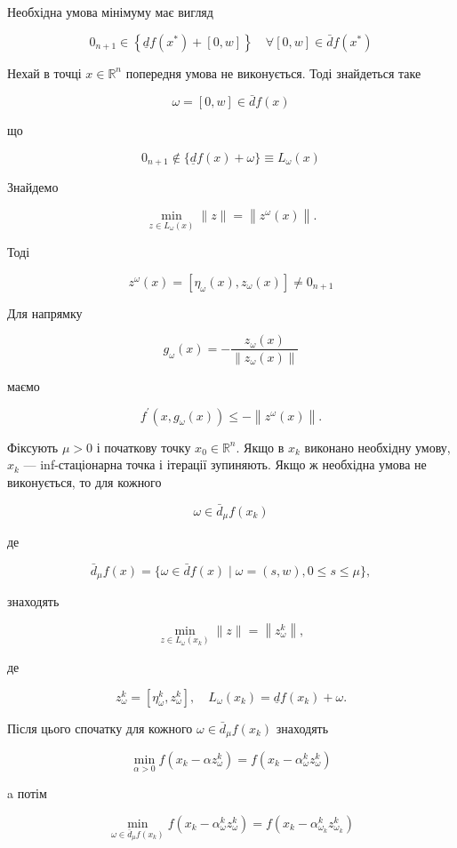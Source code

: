 \documentclass[12pt,a4paper]{extarticle}
\numberwithin{section}{part}
\begin{document}
Необхідна умова мінімуму має вигляд

$$
0_{n+1} \in\left\{\underline{d} f\left(x^{*}\right)+[0, w]\right\} \quad \forall[0, w] \in \bar{d} f\left(x^{*}\right)
$$

Нехай в точці $x \in \mathbb{R}^{n}$ попередня умова не виконується. Тоді знайдеться таке

$$
\omega=[0, w] \in \bar{d} f(x)
$$

що

$$
0_{n+1} \notin\{\underline{d} f(x)+\omega\} \equiv L_{\omega}(x)
$$

Знайдемо

$$
\min _{z \in L_{\omega}(x)}\|z\|=\left\|z^{\omega}(x)\right\| .
$$

Тоді

$$
z^{\omega}(x)=\left[\eta_{\omega}(x), z_{\omega}(x)\right] \neq 0_{n+1}
$$

Для напрямку

$$
g_{\omega}(x)=-\frac{z_{\omega}(x)}{\left\|z_{\omega}(x)\right\|}
$$

маємо

$$
f^{\prime}\left(x, g_{\omega}(x)\right) \leq-\left\|z^{\omega}(x)\right\| .
$$

Фіксують $\mu>0$ і початкову точку $x_{0} \in \mathbb{R}^{n}$. Якщо в $x_{k}$ виконано необхідну умову, $x_{k}$ --- inf-стаціонарна точка і ітерації зупиняють. Якщо ж необхідна умова не виконується, то для кожного

$$
\omega \in \bar{d}_{\mu} f\left(x_{k}\right)
$$

де

$$
\bar{d}_{\mu} f(x)=\{\omega \in \bar{d} f(x) \mid \omega=(s, w), 0 \leq s \leq \mu\},
$$

знаходять

$$
\min _{z \in L_{\omega}\left(x_{k}\right)}\|z\|=\left\|z_{\omega}^{k}\right\|,
$$

де

$$
z_{\omega}^{k}=\left[\eta_{\omega}^{k}, z_{\omega}^{k}\right], \quad L_{\omega}\left(x_{k}\right)=\underline{d} f\left(x_{k}\right)+\omega .
$$

Після цього спочатку для кожного $\omega \in \bar{d}_{\mu} f\left(x_{k}\right)$ знаходять

$$
\min _{\alpha>0} f\left(x_{k}-\alpha z_{\omega}^{k}\right)=f\left(x_{k}-\alpha_{\omega}^{k} z_{\omega}^{k}\right)
$$

a потім

$$
\min _{\omega \in \bar{d}_{\mu} f\left(x_{k}\right)} f\left(x_{k}-\alpha_{\omega}^{k} z_{\omega}^{k}\right)=f\left(x_{k}-\alpha_{\omega_{k}}^{k} z_{\omega_{k}}^{k}\right)
$$
\end{document}
